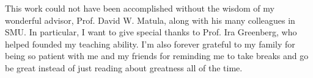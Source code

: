 This work could not have been accomplished without the wisdom of my wonderful advisor, Prof. David W. Matula, along with his many colleagues in SMU. In particular, I want to give special thanks to Prof. Ira Greenberg, who helped founded my teaching ability.  I'm also forever grateful to my family for being so patient with me and my friends for reminding me to take breaks and go be great instead of just reading about greatness all of the time. 